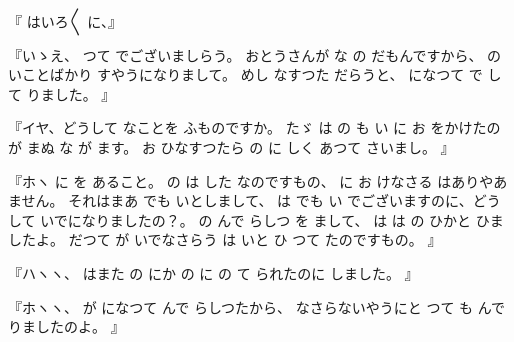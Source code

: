 
『
はいろ〳〵
に、』

『いゝえ、
つて
でございましらう。
おとうさんが
な
の
だもんですから、
の
いことばかり
すやうになりまして。
めし
なすつた
だらうと、
になつて
で
して
りました。
』

『イヤ、どうして
なことを
ふものですか。
たゞ
は
の
も
い
に
お
をかけたのが
まぬ
な
が
ます。
お
ひなすつたら
の
に
しく
あつて
さいまし。
』

『ホヽ
に
を
あること。
の
は
した
なのですもの、
に
お
けなさる
はありやあ
ません。
それはまあ
でも
いとしまして、
は
でも
い
でございますのに、どうして
いでになりましたの？。
の
んで
らしつ
を
まして、
は
は
の
ひかと
ひましたよ。
だつて
が
いでなさらう
は
いと
ひ
つて
たのですもの。
』

『ハヽヽ、
はまた
の
にか
の
に
の
て
られたのに
しました。
』

『ホヽヽ、
が
になつて
んで
らしつたから、
なさらないやうにと
つて
も
んで
りましたのよ。
』

